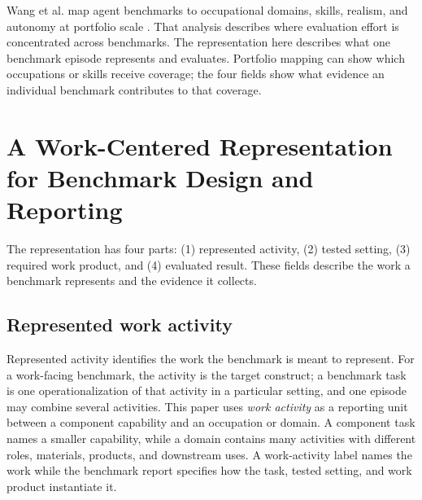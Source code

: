 \documentclass[10pt]{article}
\begin{document}
Wang et al. map agent benchmarks to occupational domains, skills, realism, and autonomy at portfolio scale \citep{wang2026realwork}. That analysis describes where evaluation effort is concentrated across benchmarks. The representation here describes what one benchmark episode represents and evaluates. Portfolio mapping can show which occupations or skills receive coverage; the four fields show what evidence an individual benchmark contributes to that coverage.

\section{A Work-Centered Representation for Benchmark Design and Reporting}
\label{sec:guidelines}
The representation has four parts: (1) represented activity, (2) tested setting, (3) required work product, and (4) evaluated result. These fields describe the work a benchmark represents and the evidence it collects.

\subsection{Represented work activity}
\label{sec:define-work}

Represented activity identifies the work the benchmark is meant to represent. For a work-facing benchmark, the activity is the target construct; a benchmark task is one operationalization of that activity in a particular setting, and one episode may combine several activities. This paper uses \textit{work activity} as a reporting unit between a component capability and an occupation or domain. A component task names a smaller capability, while a domain contains many activities with different roles, materials, products, and downstream uses. A work-activity label names the work while the benchmark report specifies how the task, tested setting, and work product instantiate it.
\end{document}
